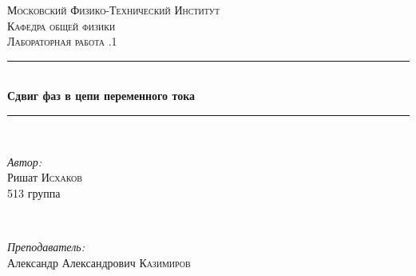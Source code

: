 \documentclass[a4paper, 12pt]{article}
\begin{document}
\begin{titlepage}

\newcommand{\HRule}{\rule{\linewidth}{0.5mm}} %

\center %
 

\textsc{\LARGE Московский Физико-Технический Институт}\\[1,5cm] %
\textsc{\Large Кафедра общей физики}\\[0.5cm] %
\textsc{\large Лабораторная работа .1}\\[0.5cm] %


\HRule
\\[0.4cm]
{ \huge \bfseries Сдвиг фаз в цепи переменного тока}
\\[0.2cm] %
\HRule
\\[1.5cm]


 

\begin{minipage}{0.4\textwidth}
	\begin{flushleft} \large
		\emph{Автор:}\\
		Ришат \textsc{Исхаков} \\
		513 группа
	\end{flushleft}
\end{minipage}
~
\begin{minipage}{0.4\textwidth}
	\begin{flushright} \large
		\emph{Преподаватель:} \\
		Александр Александрович \textsc{Казимиров} %
	\end{flushright}
\end{minipage}


\end{titlepage}
\end{document}
